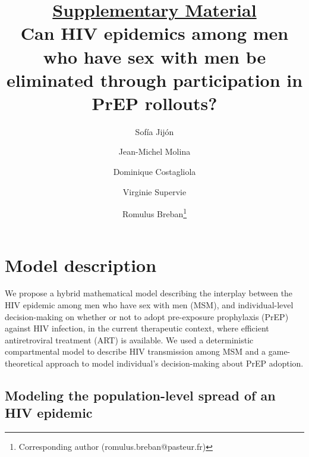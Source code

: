 \documentclass[12pt]{article}
\begin{document}
\title{\underline{Supplementary Material}\\ \bigskip
\LARGE
Can HIV epidemics among men who have sex with men be eliminated through participation {in} PrEP rollouts? 
}

\author[1]{Sof\'ia Jij\'on}%
\author[2]{Jean-Michel Molina}%
\author[1]{Dominique Costagliola}%
\author[1]{Virginie Supervie}%
\author[,3]{Romulus Breban\thanks{Corresponding author (romulus.breban@pasteur.fr)}}



\date{}

\maketitle

\newpage
\tableofcontents

\newpage
\listoftables
\listoffigures

\newpage
\section{Model description}

We propose a hybrid mathematical model describing the interplay between the HIV epidemic among men who have sex with men (MSM), and individual-level decision-making on whether or not to adopt pre-exposure prophylaxis (PrEP) against HIV infection, in the current therapeutic context, where efficient antiretroviral treatment (ART) is available. We used a deterministic compartmental model to describe HIV transmission among MSM and a game-theoretical approach to model individual's decision-making about PrEP adoption.


\subsection{Modeling the population-level spread of an HIV epidemic}
\end{document}
